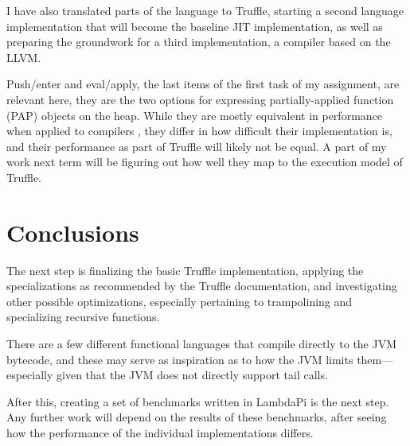\documentclass{SPFIT}
\begin{document}
I have also translated parts of the language to Truffle, starting a second
language implementation that will become the baseline JIT implementation, as
well as preparing the groundwork for a third implementation, a compiler based on
the LLVM.

Push/enter and eval/apply, the last items of the first task of my assignment,
are relevant here, they are the two options for expressing partially-applied
function (PAP) objects on the heap. While they are mostly equivalent in
performance when applied to compilers \cite{marlow2004making}, they differ in
how difficult their implementation is, and their performance as part of Truffle
will likely not be equal.  A part of my work next term will be figuring out how
well they map to the execution model of Truffle.

\section{Conclusions}
\label{sec:org3f13b07}
The next step is finalizing the basic Truffle implementation, applying the
specializations as recommended by the Truffle documentation, and investigating
other possible optimizations, especially pertaining to trampolining and
specializing recursive functions.

There are a few different functional languages that compile directly to the JVM
bytecode, and these may serve as inspiration as to how the JVM limits
them---especially given that the JVM does not directly support tail calls.

After this, creating a set of benchmarks written in LambdaPi is the next
step. Any further work will depend on the results of these benchmarks, after
seeing how the performance of the individual implementations differs.



\end{document}
